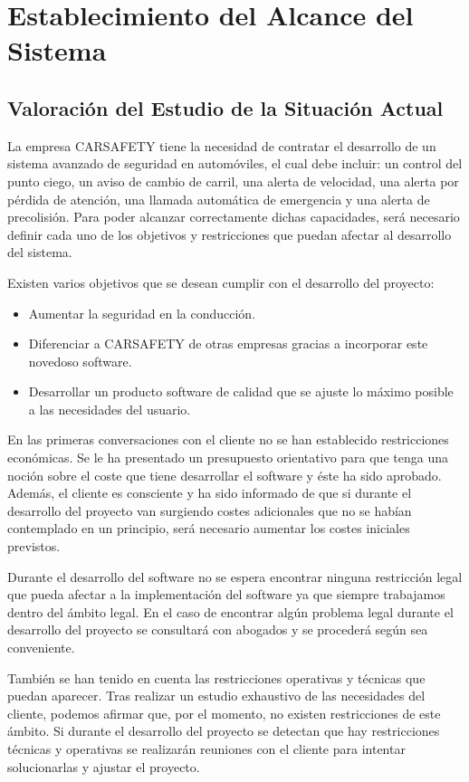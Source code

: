 

\section{Establecimiento del Alcance del Sistema}

\subsection{Valoración del Estudio de la Situación Actual}
\par La empresa CARSAFETY tiene la necesidad de contratar el desarrollo de un sistema avanzado de seguridad en automóviles, el cual debe incluir: un control del punto ciego, un aviso de cambio de carril, una alerta de velocidad, una alerta por pérdida de atención, una llamada automática de emergencia y una alerta de precolisión. Para poder alcanzar correctamente dichas capacidades, será necesario definir cada uno de los objetivos y restricciones que puedan afectar al desarrollo del sistema.
\par Existen varios objetivos que se desean cumplir con el desarrollo del proyecto:

\begin{itemize}[-]
\item Aumentar la seguridad en la conducción.
\item Diferenciar a CARSAFETY de otras empresas gracias a incorporar este novedoso software.
\item Desarrollar un producto software de calidad que se ajuste lo máximo posible a las necesidades del usuario.
\end{itemize}

\par En las primeras conversaciones con el cliente no se han establecido restricciones económicas. Se le ha presentado un presupuesto orientativo para que tenga una noción sobre el coste que tiene desarrollar el software y éste ha sido aprobado. Además, el cliente es consciente y ha sido informado de que si durante el desarrollo del proyecto van surgiendo costes adicionales que no se habían contemplado en un principio, será necesario aumentar los costes iniciales previstos.
\par Durante el desarrollo del software no se espera encontrar ninguna restricción legal que pueda afectar a la implementación del software ya que siempre trabajamos dentro del ámbito legal. En el caso de encontrar algún problema legal durante el desarrollo del proyecto se consultará con abogados y se procederá según sea conveniente.
\par También se han tenido en cuenta las restricciones operativas y técnicas que puedan aparecer. Tras realizar un estudio exhaustivo de las necesidades del cliente, podemos afirmar que, por el momento, no existen restricciones de este ámbito. Si durante el desarrollo del proyecto se detectan que hay restricciones técnicas y operativas se realizarán reuniones con el cliente para intentar solucionarlas y ajustar el proyecto.


